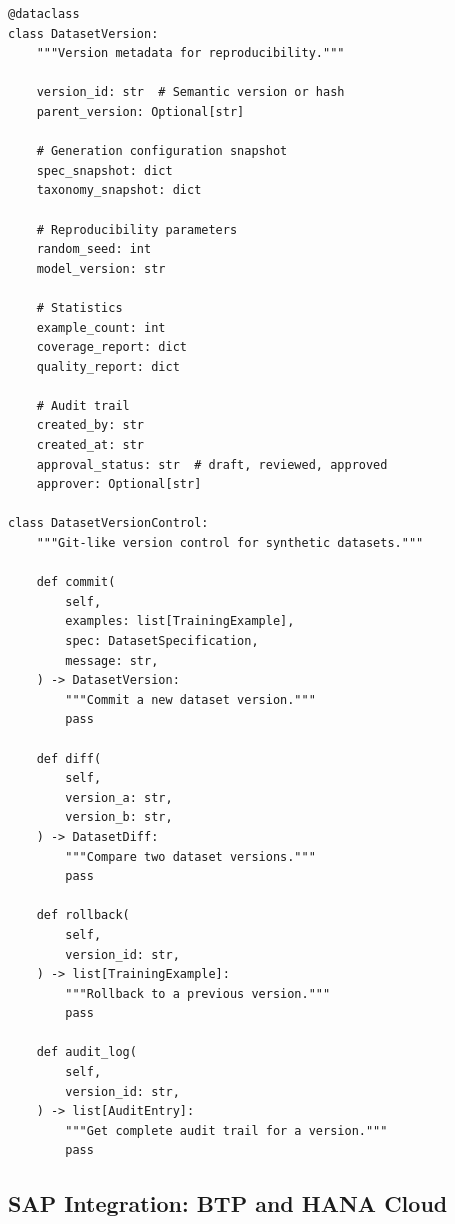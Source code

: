 \begin{lstlisting}[language=jsonx,caption={Git-like versioning for datasets.}]
@dataclass
class DatasetVersion:
    """Version metadata for reproducibility."""
    
    version_id: str  # Semantic version or hash
    parent_version: Optional[str]
    
    # Generation configuration snapshot
    spec_snapshot: dict
    taxonomy_snapshot: dict
    
    # Reproducibility parameters
    random_seed: int
    model_version: str
    
    # Statistics
    example_count: int
    coverage_report: dict
    quality_report: dict
    
    # Audit trail
    created_by: str
    created_at: str
    approval_status: str  # draft, reviewed, approved
    approver: Optional[str]

class DatasetVersionControl:
    """Git-like version control for synthetic datasets."""
    
    def commit(
        self,
        examples: list[TrainingExample],
        spec: DatasetSpecification,
        message: str,
    ) -> DatasetVersion:
        """Commit a new dataset version."""
        pass
    
    def diff(
        self,
        version_a: str,
        version_b: str,
    ) -> DatasetDiff:
        """Compare two dataset versions."""
        pass
    
    def rollback(
        self,
        version_id: str,
    ) -> list[TrainingExample]:
        """Rollback to a previous version."""
        pass
    
    def audit_log(
        self,
        version_id: str,
    ) -> list[AuditEntry]:
        """Get complete audit trail for a version."""
        pass
\end{lstlisting}

\subsection{SAP Integration: BTP and HANA Cloud}

